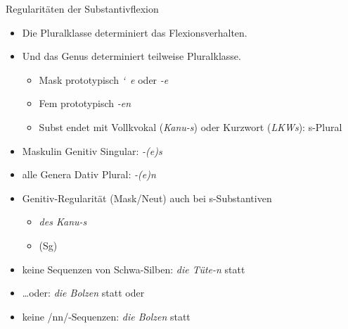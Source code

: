 \begin{frame}
  {Regularitäten der Substantivflexion}
  \pause
  \begin{itemize}[<+->]
    \item \alert{Die Pluralklasse determiniert das Flexionsverhalten.}
    \item \alert{Und das Genus determiniert teilweise Pluralklasse.}
      \begin{itemize}[<+->]
        \item \alert{Mask prototypisch \textit{\char`~e} oder \textit{-e}}
        \item \alert{Fem prototypisch \textit{-en}}
        \item Subst endet mit Vollkvokal (\textit{Kanu-s}) oder Kurzwort (\textit{LKWs}): s-Plural
      \end{itemize}
    \Halbzeile
  \item \alert{Maskulin Genitiv Singular: \textit{-(e)s}} 
    \item \alert{alle Genera Dativ Plural: \textit{-(e)n}} 
    \item Genitiv-Regularität (Mask/Neut) auch bei s-Substantiven
      \begin{itemize}[<+->]
        \item \textit{des Kanu-s}
        \item {} (Sg)
      \end{itemize}
  \Halbzeile
    \item keine Sequenzen von Schwa-Silben: \textit{die Tüte-n} statt 
    \item \ldots oder: \textit{die Bolzen} statt  oder 
    \item keine /nn/-Sequenzen: \textit{die Bolzen} statt 
  \end{itemize}
\end{frame}

